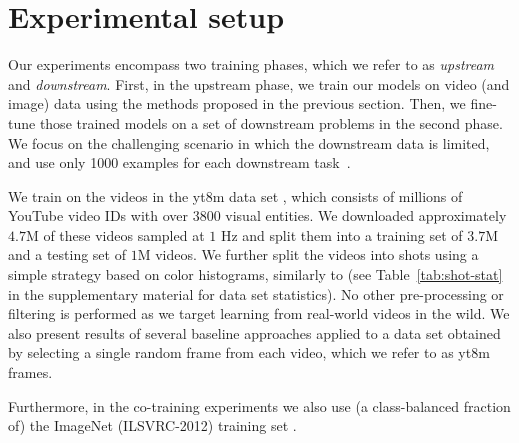 \documentclass[10pt,twocolumn,letterpaper]{article}
\renewcommand{\paragraph}[1]{\noindent{\bf #1}\quad}
\begin{document}
\section{Experimental setup} \label{sec:exp-setup}
Our experiments encompass two training phases, which we refer to as \emph{upstream} and \emph{downstream}.
First, in the upstream phase, we train our models on video (and image) data using the methods proposed in the previous section.
Then, we fine-tune those trained models on a set of downstream problems in the second phase.
We focus on the challenging scenario in which the downstream data is limited, and use only 1000 examples for each downstream task~\cite{zhai2019visual}.

\paragraph{Upstream training}
We train on the videos in the \gls{yt8m} data set \cite{abu2016youtube}, which consists of millions of YouTube video IDs with over 3800 visual entities.
We downloaded approximately $4.7$M of these videos sampled at $1$ Hz and split them into a training set of $3.7$M and a testing set of $1$M videos.
We further split the videos into shots using a simple strategy based on color histograms, similarly to \cite{mas2003video} (see Table~\ref{tab:shot-stat} in the supplementary material for data set statistics). No other pre-processing or filtering is performed as we target learning from real-world videos in the wild. We also present results of several baseline approaches applied to a data set obtained by selecting a single random frame from each video, which we refer to as \gls{yt8m} frames.

Furthermore, in the co-training experiments we also use (a class-balanced fraction of) the ImageNet (ILSVRC-2012) training set \cite{deng2009imagenet}. 
\end{document}
